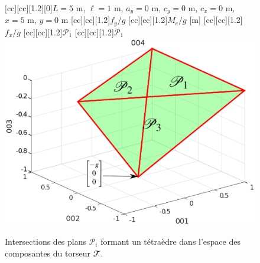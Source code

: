 \begin{figure}[h!]
\centering
{}[cc][cc][1.2][0]{$L =5$ m, $\ell=1 $ m, $a_y = 0$ m, $c_y = 0$ m, $c_x = 0$ m, $x = 5$ m, $y = 0$ m}
[cc][cc][1.2]{$f_y/g$}
[cc][cc][1.2]{$M_e/g$ [m]}
[cc][cc][1.2]{
{$f_x/g$}}
[cc][cc][1.2]{$\mathcal{P}_1$}
[cc][cc][1.2]{$\mathcal{P}_1$}
\resizebox{0.8\textwidth}{!}
{\includegraphics{img/torseur_poly.eps}}
\caption[Tétraèdre des torseurs]{\label{chap1:fig:torseur_poly}Intersections des plans $\mathcal{P}_i$ formant un tétraèdre dans l'espace des composantes du torseur $\mathbfcal{T}$.}
\end{figure}